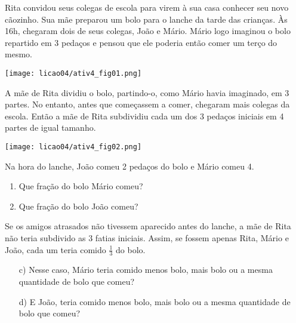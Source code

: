 \begin{atividade}{}
Rita convidou seus colegas de escola para virem à sua casa conhecer seu novo cãozinho. Sua mãe preparou um bolo para o lanche da tarde das crianças. Às 16h, chegaram dois de seus colegas, João e Mário. Mário logo imaginou o bolo repartido em 3 pedaços e pensou que ele poderia então comer um terço do mesmo.

\begin{center}
\texttt{[image: licao04/ativ4\_fig01.png]}
\end{center}

A mãe de Rita dividiu o bolo, partindo-o, como Mário havia imaginado, em 3 partes. No entanto, antes que começassem a comer, chegaram mais colegas da escola. Então a mãe de Rita subdividiu cada um dos 3 pedaços iniciais em 4 partes de igual tamanho.

\begin{center}
\texttt{[image: licao04/ativ4\_fig02.png]}
\end{center}



Na hora do lanche, João comeu 2 pedaços do bolo e Mário comeu 4.
\begin{enumerate} %
  \item     Que fração do bolo Mário comeu?
  \item     Que fração do bolo João comeu?
\end{enumerate} %

Se os amigos atrasados não tivessem aparecido antes do lanche, a mãe de Rita não teria subdivido as 3 fatias iniciais. Assim, se fossem apenas Rita, Mário e João, cada um teria comido $\frac{1}{3}$ do bolo.
\begin{enumerate} %
  \item[c)]     Nesse caso, Mário teria comido menos bolo, mais bolo ou a mesma quantidade de bolo que comeu?
  \item[d)]     E João, teria comido menos bolo, mais bolo ou a mesma quantidade de bolo que comeu?
\end{enumerate} %
\end{atividade}


